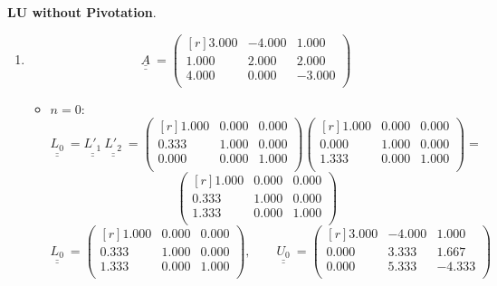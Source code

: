 \documentclass{report}[10pts]
\begin{document}
\textbf{LU without Pivotation}.
\begin{enumerate}[- Ex. 1]
\item
\[
   \underline{\underline{A}}~
   =
      \begin{pmatrix*}[r]
         3.000 & -4.000 & 1.000\\
         1.000 & 2.000 & 2.000\\
         4.000 & 0.000 & -3.000\\
      \end{pmatrix*}
\]
\begin{itemize}
\item $n=0$:
\[
   \underline{\underline{L_{0}}}~
   =
   \underline{\underline{L'_{1}}}~
   \underline{\underline{L'_{2}}}~
   =
      \begin{pmatrix}[r]
         1.000 & 0.000 & 0.000\\
         0.333 & 1.000 & 0.000\\
         0.000 & 0.000 & 1.000\\
      \end{pmatrix}
      \begin{pmatrix}[r]
         1.000 & 0.000 & 0.000\\
         0.000 & 1.000 & 0.000\\
         1.333 & 0.000 & 1.000\\
      \end{pmatrix}
   =
\]
\[
      \begin{pmatrix*}[r]
         1.000 & 0.000 & 0.000\\
         0.333 & 1.000 & 0.000\\
         1.333 & 0.000 & 1.000\\
      \end{pmatrix*}
\]
\[
   \underline{\underline{L_{0}}}~
   =
      \begin{pmatrix*}[r]
         1.000 & 0.000 & 0.000\\
         0.333 & 1.000 & 0.000\\
         1.333 & 0.000 & 1.000\\
      \end{pmatrix*}
   ,\qquad
   \underline{\underline{U_{0}}}~
   =
      \begin{pmatrix*}[r]
         3.000 & -4.000 & 1.000\\
         0.000 & 3.333 & 1.667\\
         0.000 & 5.333 & -4.333\\
      \end{pmatrix*}
\]
\[
\]
\end{itemize}
\end{enumerate}
\end{document}
